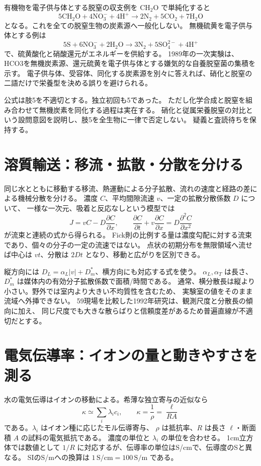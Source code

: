 有機物を電子供与体とする脱窒の収支例を \(\mathrm{CH_2O}\) で単純化すると
\[
 \mathrm{5CH_2O+4NO_3^-+4H^+\longrightarrow2N_2+5CO_2+7H_2O}
\]
となる。これを全ての脱窒生物の炭素源へ一般化しない。
無機硫黄を電子供与体とする例は
\[
 \mathrm{5S+6NO_3^-+2H_2O\longrightarrow3N_2+5SO_4^{2-}+4H^+}
\]
で、硫黄酸化と硝酸還元がエネルギーを供給する。
1989年の一次実験は、HCO3を無機炭素源、還元硫黄を電子供与体とする嫌気的な自養脱窒菌の集積を示す\cite{gc_sulfur_denit}。
電子供与体、受容体、同化する炭素源を別々に答えれば、硝化と脱窒の二語だけで栄養型を決める誤りを避けられる。
\begin{tcolorbox}[title=令和2年度問19の公式と科学的例外]
公式は肢5を不適切とする。独立初回も5であった。
ただし化学合成と脱窒を組み合わせて無機炭素を同化する過程は実在する。
硝化と従属栄養脱窒の対比という設問意図を説明し、肢5を全生物に一律で否定しない。
疑義と査読待ちを保持する。
\end{tcolorbox}

\section{溶質輸送：移流・拡散・分散を分ける}
\label{theory:geochemistry:transport}
同じ水とともに移動する移流、熱運動による分子拡散、流れの速度と経路の差による機械分散を分ける。
濃度 \(C\)、平均間隙流速 \(v\)、一定の拡散分散係数 \(D\) について、
一様な一次元、吸着と反応なしという模型では
\[
 J=vC-D\frac{\partial C}{\partial x},\qquad
 \frac{\partial C}{\partial t}+v\frac{\partial C}{\partial x}
 =D\frac{\partial^2 C}{\partial x^2}
\]
が流束と連続の式から得られる。
Fick則の比例する量は濃度勾配に対する流束であり、個々の分子の一定の流速ではない。
点状の初期分布を無限領域へ流せば中心は \(vt\)、分散は \(2Dt\) となり、移動と広がりを区別できる。

縦方向には \(D_L=\alpha_L|v|+D_m^\ast\)、横方向にも対応する式を使う。
\(\alpha_L,\alpha_T\) は長さ、\(D_m^\ast\) は媒体内の有効分子拡散係数で面積/時間である。
通常、横分散長は縦より小さい。野外では室内より大きい不均質性を含むため、
実験室の値をそのまま流域へ外挿できない。
59現場を比較した1992年研究は、観測尺度と分散長の傾向に加え、
同じ尺度でも大きな散らばりと信頼度差があるため普遍直線が不適切だとする\cite{gc_dispersion}。

\section{電気伝導率：イオンの量と動きやすさを測る}
\label{theory:geochemistry:conductivity}
水の電気伝導はイオンの移動による。希薄な独立寄与の近似なら
\[
 \kappa\simeq\sum_i\lambda_i c_i,\qquad
 \kappa=\frac1\rho=\frac{\ell}{RA}
\]
である。\(\lambda_i\) はイオン種に応じたモル伝導寄与、
\(\rho\) は抵抗率、\(R\) は長さ \(\ell\)・断面積 \(A\) の試料の電気抵抗である。
濃度の単位と \(\lambda_i\) の単位を合わせる。
1cm立方体では数値として \(1/R\) に対応するが、伝導率の単位はS/cmで、伝導度のSと異なる。
SIのS/mへの換算は \(1\,\mathrm{S/cm}=100\,\mathrm{S/m}\) である。


